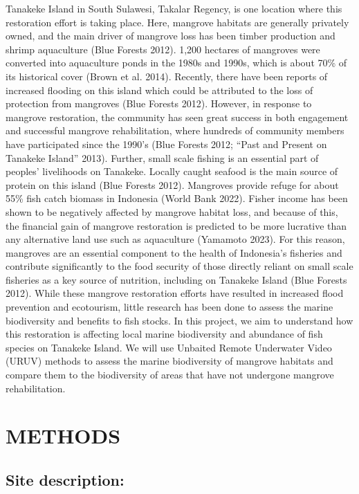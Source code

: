 \documentclass[
]{article}
\begin{document}
Tanakeke Island in South Sulawesi, Takalar Regency, is one location where this restoration effort is taking place. Here, mangrove habitats are generally privately owned, and the main driver of mangrove loss has been timber production and shrimp aquaculture (Blue Forests 2012). 1,200 hectares of mangroves were converted into aquaculture ponds in the 1980s and 1990s, which is about 70\% of its historical cover (Brown et al. 2014). Recently, there have been reports of increased flooding on this island which could be attributed to the loss of protection from mangroves (Blue Forests 2012). However, in response to mangrove restoration, the community has seen great success in both engagement and successful mangrove rehabilitation, where hundreds of community members have participated since the 1990's (Blue Forests 2012; {``Past and {Present} on {Tanakeke Island}''} 2013). Further, small scale fishing is an essential part of peoples' livelihoods on Tanakeke. Locally caught seafood is the main source of protein on this island (Blue Forests 2012). Mangroves provide refuge for about 55\% fish catch biomass in Indonesia (World Bank 2022). Fisher income has been shown to be negatively affected by mangrove habitat loss, and because of this, the financial gain of mangrove restoration is predicted to be more lucrative than any alternative land use such as aquaculture (Yamamoto 2023). For this reason, mangroves are an essential component to the health of Indonesia's fisheries and contribute significantly to the food security of those directly reliant on small scale fisheries as a key source of nutrition, including on Tanakeke Island (Blue Forests 2012). While these mangrove restoration efforts have resulted in increased flood prevention and ecotourism, little research has been done to assess the marine biodiversity and benefits to fish stocks. In this project, we aim to understand how this restoration is affecting local marine biodiversity and abundance of fish species on Tanakeke Island. We will use Unbaited Remote Underwater Video (URUV) methods to assess the marine biodiversity of mangrove habitats and compare them to the biodiversity of areas that have not undergone mangrove rehabilitation.

\section{METHODS}\label{methods}

\subsection{Site description:}\label{site-description}
\end{document}
